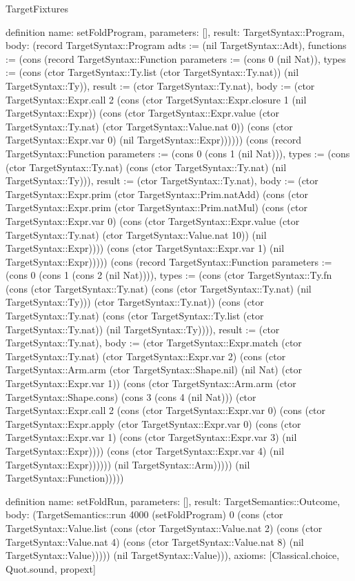 \begin{lexlean}{TargetFixtures}
\begin{semanticmodule}
definition{
  name: setFoldProgram,
  parameters: [],
  result: TargetSyntax::Program,
  body: (record TargetSyntax::Program {adts := (nil TargetSyntax::Adt), functions := (cons (record TargetSyntax::Function {parameters := (cons 0 (nil Nat)), types := (cons (ctor TargetSyntax::Ty.list (ctor TargetSyntax::Ty.nat)) (nil TargetSyntax::Ty)), result := (ctor TargetSyntax::Ty.nat), body := (ctor TargetSyntax::Expr.call 2 (cons (ctor TargetSyntax::Expr.closure 1 (nil TargetSyntax::Expr)) (cons (ctor TargetSyntax::Expr.value (ctor TargetSyntax::Ty.nat) (ctor TargetSyntax::Value.nat 0)) (cons (ctor TargetSyntax::Expr.var 0) (nil TargetSyntax::Expr)))))}) (cons (record TargetSyntax::Function {parameters := (cons 0 (cons 1 (nil Nat))), types := (cons (ctor TargetSyntax::Ty.nat) (cons (ctor TargetSyntax::Ty.nat) (nil TargetSyntax::Ty))), result := (ctor TargetSyntax::Ty.nat), body := (ctor TargetSyntax::Expr.prim (ctor TargetSyntax::Prim.natAdd) (cons (ctor TargetSyntax::Expr.prim (ctor TargetSyntax::Prim.natMul) (cons (ctor TargetSyntax::Expr.var 0) (cons (ctor TargetSyntax::Expr.value (ctor TargetSyntax::Ty.nat) (ctor TargetSyntax::Value.nat 10)) (nil TargetSyntax::Expr)))) (cons (ctor TargetSyntax::Expr.var 1) (nil TargetSyntax::Expr))))}) (cons (record TargetSyntax::Function {parameters := (cons 0 (cons 1 (cons 2 (nil Nat)))), types := (cons (ctor TargetSyntax::Ty.fn (cons (ctor TargetSyntax::Ty.nat) (cons (ctor TargetSyntax::Ty.nat) (nil TargetSyntax::Ty))) (ctor TargetSyntax::Ty.nat)) (cons (ctor TargetSyntax::Ty.nat) (cons (ctor TargetSyntax::Ty.list (ctor TargetSyntax::Ty.nat)) (nil TargetSyntax::Ty)))), result := (ctor TargetSyntax::Ty.nat), body := (ctor TargetSyntax::Expr.match (ctor TargetSyntax::Ty.nat) (ctor TargetSyntax::Expr.var 2) (cons (ctor TargetSyntax::Arm.arm (ctor TargetSyntax::Shape.nil) (nil Nat) (ctor TargetSyntax::Expr.var 1)) (cons (ctor TargetSyntax::Arm.arm (ctor TargetSyntax::Shape.cons) (cons 3 (cons 4 (nil Nat))) (ctor TargetSyntax::Expr.call 2 (cons (ctor TargetSyntax::Expr.var 0) (cons (ctor TargetSyntax::Expr.apply (ctor TargetSyntax::Expr.var 0) (cons (ctor TargetSyntax::Expr.var 1) (cons (ctor TargetSyntax::Expr.var 3) (nil TargetSyntax::Expr)))) (cons (ctor TargetSyntax::Expr.var 4) (nil TargetSyntax::Expr)))))) (nil TargetSyntax::Arm))))}) (nil TargetSyntax::Function))))})
}

definition{
  name: setFoldRun,
  parameters: [],
  result: TargetSemantics::Outcome,
  body: (TargetSemantics::run 4000 (setFoldProgram) 0 (cons (ctor TargetSyntax::Value.list (cons (ctor TargetSyntax::Value.nat 2) (cons (ctor TargetSyntax::Value.nat 4) (cons (ctor TargetSyntax::Value.nat 8) (nil TargetSyntax::Value))))) (nil TargetSyntax::Value))),
  axioms: [Classical.choice, Quot.sound, propext]
}


\end{semanticmodule}
\end{lexlean}
